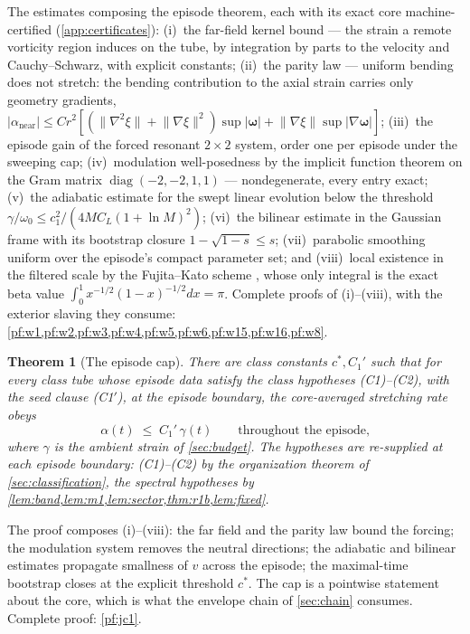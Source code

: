 \documentclass[11pt,letterpaper]{amsart}
\newtheorem{theorem}{Theorem}[section]
\theoremstyle{definition}
\theoremstyle{remark}
\newcommand{\om}{\omega}
\newcommand{\vort}{\boldsymbol{\omega}}
\newcommand{\norm}[1]{\lVert #1 \rVert}
\newcommand{\abs}[1]{\lvert #1 \rvert}
\begin{document}
The estimates composing the episode theorem, each with its exact core
machine-certified (\cref{app:certificates}): \textup{(i)}~the far-field kernel bound
--- the strain a remote vorticity region induces on the tube, by integration by parts
to the velocity and Cauchy--Schwarz, with explicit constants; \textup{(ii)}~the parity
law --- uniform bending does not stretch: the bending contribution to the axial strain
carries only geometry gradients, $\abs{\alpha_{\mathrm{near}}}\le
Cr^2[(\norm{\nabla^2\xi}+\norm{\nabla\xi}^2)\sup\abs{\vort}+\norm{\nabla\xi}\sup\abs{\nabla\vort}]$;
\textup{(iii)}~the episode gain of the forced resonant $2\times2$ system, order one
per episode under the sweeping cap; \textup{(iv)}~modulation well-posedness by the
implicit function theorem on the Gram matrix $\operatorname{diag}(-2,-2,1,1)$ ---
nondegenerate, every entry exact; \textup{(v)}~the adiabatic estimate for the swept
linear evolution below the threshold $\gamma/\om_0\le c_1^2/(4MC_L(1+\ln M)^2)$;
\textup{(vi)}~the bilinear estimate in the Gaussian frame with its bootstrap closure
$1-\sqrt{1-s}\le s$; \textup{(vii)}~parabolic smoothing uniform over the episode's
compact parameter set; and \textup{(viii)}~local existence in the filtered scale by
the Fujita--Kato scheme \cite{FujitaKato1964,Kato1984}, whose only integral is the
exact beta value $\int_0^1x^{-1/2}(1-x)^{-1/2}dx=\pi$. Complete proofs of
(i)--(viii), with the exterior slaving they consume:
\cref{pf:w1,pf:w2,pf:w3,pf:w4,pf:w5,pf:w6,pf:w15,pf:w16,pf:w8}.

\begin{theorem}[The episode cap]\label{thm:jc1}
There are class constants $c^*, C_1'$ such that for every class tube whose episode
data satisfy the class hypotheses \textup{(C1)--(C2)}, with the seed clause
\textup{(C1$'$)}, at the episode boundary, the
core-averaged stretching rate obeys
\[
\alpha(t)\;\le\;C_1'\,\gamma(t)\qquad\text{throughout the episode,}
\]
where $\gamma$ is the ambient strain of \cref{sec:budget}. The hypotheses are
re-supplied at each episode boundary: \textup{(C1)--(C2)} by the organization theorem
of \cref{sec:classification}, the spectral hypotheses by
\cref{lem:band,lem:m1,lem:sector,thm:r1b,lem:fixed}.
\end{theorem}

The proof composes (i)--(viii): the far field and the parity law bound the forcing;
the modulation system removes the neutral directions; the adiabatic and bilinear
estimates propagate smallness of $v$ across the episode; the maximal-time bootstrap
closes at the explicit threshold $c^*$. The cap is a pointwise statement about the
core, which is what the envelope chain of \cref{sec:chain} consumes. Complete
proof: \cref{pf:jc1}.
\end{document}
